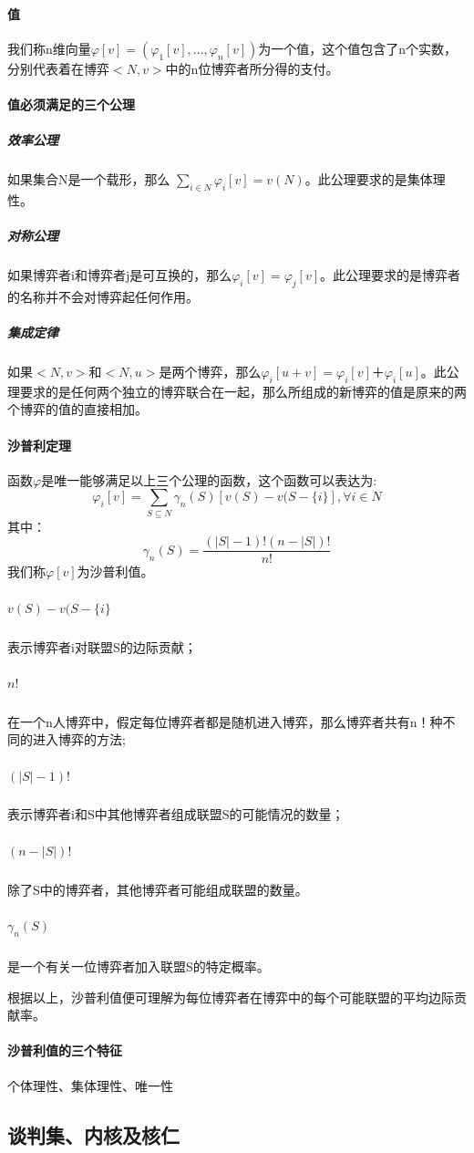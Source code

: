 \documentclass[12pt,a4paper]{article}
\begin{document}
\paragraph{值} 我们称n维向量$\varphi[v]=(\varphi_1[v],...,\varphi_n[v])$为一个值，这个值包含了n个实数，分别代表着在博弈$<N,v>$中的n位博弈者所分得的支付。

\paragraph{值必须满足的三个公理}
	\subparagraph{效率公理} 如果集合N是一个载形，那么 $\sum_{i \in N}\varphi_i[v] = v(N)$。此公理要求的是集体理性。
	\subparagraph{对称公理}如果博弈者i和博弈者j是可互换的，那么$\varphi_i[v]=\varphi_j[v]$。此公理要求的是博弈者的名称并不会对博弈起任何作用。
	\subparagraph{集成定律}如果$<N,v>$和$<N,u>$是两个博弈，那么$\varphi_i[u+v]=\varphi_i[v]＋\varphi_i[u]$。此公理要求的是任何两个独立的博弈联合在一起，那么所组成的新博弈的值是原来的两个博弈的值的直接相加。
\paragraph{沙普利定理} 函数$\varphi$是唯一能够满足以上三个公理的函数，这个函数可以表达为:
\begin{equation}
	\varphi_i[v] = \sum_{S \subseteq N} \gamma_n(S)[v(S)-v(S-\{i\}], \forall i \in N
\end{equation}
其中：
\begin{equation}
	\gamma_n(S) = \frac{(|S|-1)!(n-|S|)!}{n!}
\end{equation}
我们称$\varphi[v]$为沙普利值。
	\subparagraph{$v(S)-v(S-\{i\}$}  表示博弈者i对联盟S的边际贡献；
	\subparagraph{$n!$} 在一个n人博弈中，假定每位博弈者都是随机进入博弈，那么博弈者共有n！种不同的进入博弈的方法;
	\subparagraph{$(|S|-1)!$} 表示博弈者i和S中其他博弈者组成联盟S的可能情况的数量；
	\subparagraph{$(n-|S|)!$} 除了S中的博弈者，其他博弈者可能组成联盟的数量。
	\subparagraph{$\gamma_n(S)$} 是一个有关一位博弈者加入联盟S的特定概率。

根据以上，沙普利值便可理解为每位博弈者在博弈中的每个可能联盟的平均边际贡献率。
\paragraph{沙普利值的三个特征} 个体理性、集体理性、唯一性

\subsection{谈判集、内核及核仁}
\end{document}
